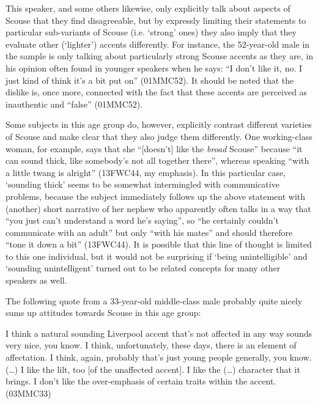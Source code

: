 This speaker, and some others likewise, only explicitly talk about aspects of Scouse that they find disagreeable, but by expressly limiting their statements to particular sub-variants of Scouse (i.e. `strong' ones) they also imply that they evaluate other (`lighter') accents differently.
For instance, the 52-year-old male in the sample is only talking about particularly strong Scouse accents as they are, in his opinion often found in younger speakers when he says: ``I don't like it, no. I just kind of think it's a bit put on'' (01MMC52).
It should be noted that the dislike is, once more, connected with the fact that these accents are perceived as inauthentic and ``false'' (01MMC52).

Some subjects in this age group do, however, explicitly contrast different varieties of Scouse and make clear that they also judge them differently.
One working-class woman, for example, says that  she ``[doesn't] like the \emph{broad} Scouse'' because ``it can sound thick, like somebody's not all together there'', whereas speaking ``with a little twang is alright'' (13FWC44, my emphasis).
In this particular case, `sounding thick' seems to be somewhat intermingled with communicative problems, because the subject immediately follows up the above statement with (another) short narrative of her nephew who apparently often talks in a way that ``you just can't understand a word he's saying'', so ``he certainly couldn't communicate with an adult'' but only ``with his mates'' and should therefore ``tone it down a bit'' (13FWC44).
It is possible that this line of thought is limited to this one individual, but it would not be surprising if `being unintelligible' and `sounding unintelligent' turned out to be related concepts for many other speakers as well.

The following quote from a 33-year-old middle-class male probably quite nicely sums up attitudes towards Scouse in this age group:
\begin{example}
	I think a natural sounding Liverpool accent that's not affected in any way sounds very nice, you know.
	I think, unfortunately, these days, there is an element of affectation.
	I think, again, probably that's just young people generally, you know.
	(\ldots) I like the lilt, too [of the unaffected accent].
	I like the (\ldots) character that it brings.
	I don't like the over-emphasis of certain traits within the accent. (03MMC33)
\end{example}

